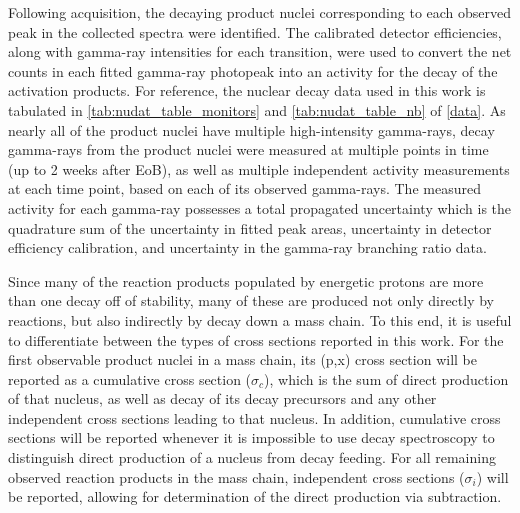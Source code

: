 \documentclass[3p]{elsarticle}
\begin{document}
Following  acquisition, the decaying product nuclei corresponding to each observed peak in the collected spectra were identified.
The calibrated detector efficiencies, along with gamma-ray intensities for each transition, were used to convert the net  counts in each fitted gamma-ray photopeak into an activity for the decay of the activation products.  
For reference, the nuclear decay data used in this work is tabulated in \autoref{tab:nudat_table_monitors} and \autoref{tab:nudat_table_nb} of \ref{data}.
As nearly all of the product nuclei have multiple high-intensity gamma-rays, decay gamma-rays from the product nuclei were measured at multiple points in time (up to 2 weeks after EoB), as well as multiple independent activity measurements at each time point, based on each of its observed gamma-rays.
The measured activity for each gamma-ray possesses a total propagated uncertainty which is the quadrature sum of the uncertainty in  fitted peak areas, uncertainty in detector efficiency calibration, and uncertainty in the gamma-ray branching ratio data.






Since many of the reaction products populated by energetic protons are more than one decay off of stability, many of these are produced not only  directly by reactions, but also indirectly by decay down a mass chain.
To this end, it is useful to differentiate between the types of cross sections reported in this work. 
For the first observable product nuclei in a mass chain, its (p,x) cross section will be reported as a cumulative cross section ($\sigma_c$), which is the sum of direct production of that nucleus, as well as decay of its decay precursors and any other independent cross sections leading to that nucleus. 
In addition, cumulative cross sections will be reported whenever it is impossible to use decay spectroscopy to distinguish direct production of a nucleus from decay feeding.
For all remaining observed reaction products in the mass chain, independent cross sections ($\sigma_i$) will be reported, allowing for determination of the direct production via subtraction.  
\end{document}
